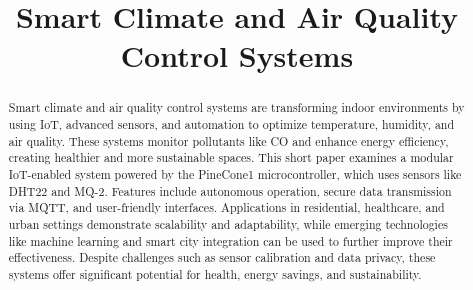 \documentclass[USenglish,oneside,twocolumn]{article}
\begin{document}
\title{\huge Smart Climate and Air Quality Control Systems}


\begin{abstract}
    {Smart climate and air quality control systems are transforming indoor environments by using IoT, advanced sensors, and automation to optimize temperature, humidity, and air quality. These systems monitor pollutants like CO and enhance energy efficiency, creating healthier and more sustainable spaces. This short paper examines a modular IoT-enabled system powered by the PineCone1 microcontroller, which uses sensors like DHT22 and MQ-2. Features include autonomous operation, secure data transmission via MQTT, and user-friendly interfaces. Applications in residential, healthcare, and urban settings demonstrate scalability and adaptability, while emerging technologies like machine learning and smart city integration can be used to further improve their effectiveness. Despite challenges such as sensor calibration and data privacy, these systems offer significant potential for health, energy savings, and sustainability.}
\end{abstract}

\maketitle
\end{document}
